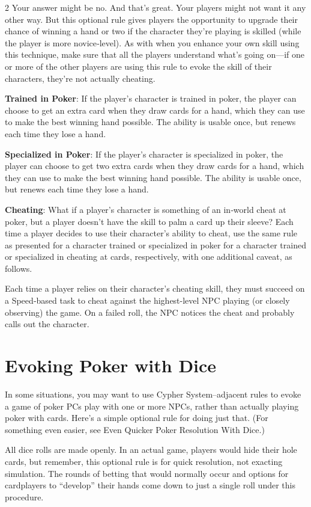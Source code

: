 \begin{multicols}{2}
Your answer might be no. And that’s great. Your players might not want it any other way. But this optional rule gives players the opportunity to upgrade their chance of winning a hand or two if the character they’re playing is skilled (while the player is more novice‑level). As with when you enhance your own skill using this technique, make sure that all the players understand what’s going on—if one or more of the other players are using this rule to evoke the skill of their characters, they’re not actually cheating.

\textbf{Trained in Poker}: If the player’s character is trained in poker, the player can choose to get an extra card when they draw cards for a hand, which they can use to make the best winning hand possible. The ability is usable once, but renews each time they lose a hand. 

\textbf{Specialized in Poker}: If the player’s character is specialized in poker, the player can choose to get two extra cards when they draw cards for a hand, which they can use to make the best winning hand possible. The ability is usable once, but renews each time they lose a hand. 

\textbf{Cheating}: What if a player’s character is something of an in‑world cheat at poker, but a player doesn’t have the skill to palm a card up their sleeve? Each time a player decides to use their character’s ability to cheat, use the same rule as presented for a character trained or specialized in poker for a character trained or specialized in cheating at cards, respectively, with one additional caveat, as follows. 

Each time a player relies on their character’s cheating skill, they must succeed on a Speed‑based task to cheat against the highest-level NPC playing (or closely observing) the game. On a failed roll, the NPC notices the cheat and probably calls out the character.

\section{Evoking Poker with Dice}
 
In some situations, you may want to use Cypher System–adjacent rules to evoke a game of poker PCs play with one or more NPCs, rather than actually playing poker with cards. Here’s a simple optional rule for doing just that. (For something even easier, see Even Quicker Poker Resolution With Dice.) 

All dice rolls are made openly. In an actual game, players would hide their hole cards, but remember, this optional rule is for quick resolution, not exacting simulation. The rounds of betting that would normally occur and options for cardplayers to “develop” their hands come down to just a single roll under this procedure.


\end{multicols}
